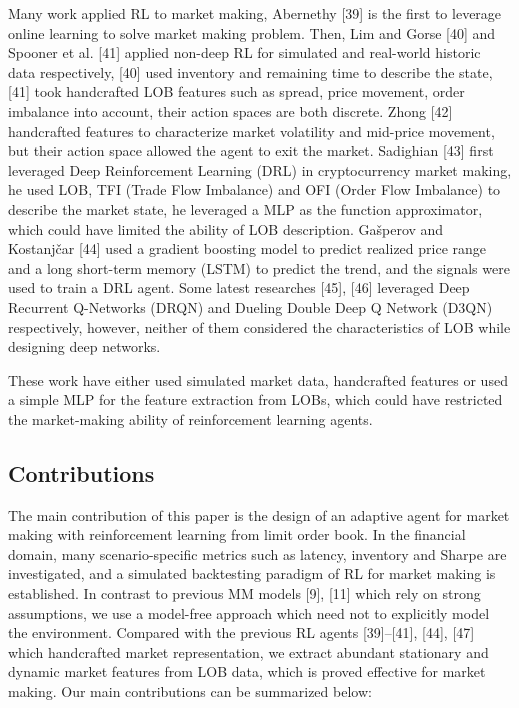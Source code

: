 \documentclass[conference]{IEEEtran}
\begin{document}
Many work applied RL to market making, Abernethy [39] is the first to leverage online learning to solve market making problem. Then, Lim and Gorse [40] and Spooner et al. [41] applied non-deep RL for simulated and real-world historic data respectively, [40] used inventory and remaining time to describe the state, [41] took handcrafted LOB features such as spread, price movement, order imbalance into account, their action spaces are both discrete. Zhong [42] handcrafted features to characterize market volatility and mid-price movement, but their action space allowed the agent to exit the market. Sadighian [43] first leveraged Deep Reinforcement Learning (DRL) in cryptocurrency market making, he used LOB, TFI (Trade Flow Imbalance) and OFI (Order Flow Imbalance) to describe the market state, he leveraged a MLP as the function approximator, which could have limited the ability of LOB description. Gašperov and Kostanjčar [44] used a gradient boosting model to predict realized price range and a long short-term memory (LSTM) to predict the trend, and the signals were used to train a DRL agent. Some latest researches [45], [46] leveraged Deep Recurrent Q-Networks (DRQN) and Dueling Double Deep Q Network (D3QN) respectively, however, neither of them considered the characteristics of LOB while designing deep networks.

These work have either used simulated market data, handcrafted features or used a simple MLP for the feature extraction from LOBs, which could have restricted the market-making ability of reinforcement learning agents.

\subsection{Contributions}
The main contribution of this paper is the design of an adaptive agent for market making with reinforcement learning from limit order book. In the financial domain, many scenario-specific metrics such as latency, inventory and Sharpe are investigated, and a simulated backtesting paradigm of RL for market making is established. In contrast to previous MM models [9], [11] which rely on strong assumptions, we use a model-free approach which need not to explicitly model the environment. Compared with the previous RL agents [39]--[41], [44], [47] which handcrafted market representation, we extract abundant stationary and dynamic market features from LOB data, which is proved effective for market making. Our main contributions can be summarized below:
\end{document}

